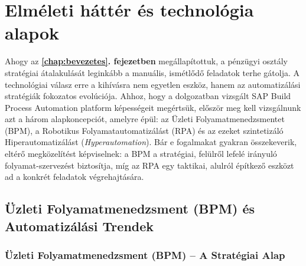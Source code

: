 
\chapter{Elméleti háttér és technológia alapok}
\label{chap:elmeleti_hatter}


Ahogy az \textbf{\ref{chap:bevezetes}. fejezetben} megállapítottuk, a pénzügyi osztály stratégiai átalakulását leginkább a manuális, ismétlődő feladatok terhe gátolja.
A technológiai válasz erre a kihívásra nem egyetlen eszköz, hanem az automatizálási stratégiák fokozatos evolúciója.
Ahhoz, hogy a dolgozatban vizsgált SAP Build Process Automation platform képességeit megértsük, először meg kell vizsgálnunk azt a három alapkoncepciót, amelyre épül: az Üzleti Folyamatmenedzsmentet (BPM), a Robotikus Folyamatautomatizálást (RPA) és az ezeket szintetizáló Hiperautomatizálást (\textit{Hyperautomation}).
Bár e fogalmakat gyakran összekeverik, eltérő megközelítést képviselnek: a BPM a stratégiai, felülről lefelé irányuló folyamat-szervezést biztosítja, míg az RPA egy taktikai, alulról építkező eszközt ad a konkrét feladatok végrehajtására.


\section{Üzleti Folyamatmenedzsment (BPM) és Automatizálási Trendek}
\label{sec:bpm_es_trendek}


\subsection{Üzleti Folyamatmenedzsment (BPM) – A Stratégiai Alap}
\label{ssec:bpm}


